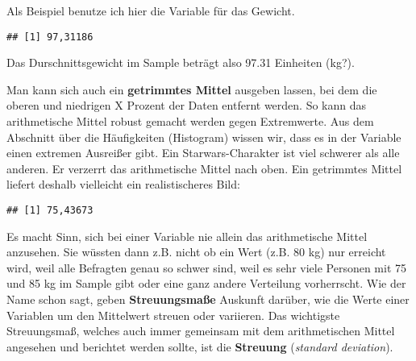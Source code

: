\documentclass[
]{book}
\newenvironment{Shaded}{\begin{snugshade}}{\end{snugshade}}
\newcommand{\AttributeTok}[1]{\textcolor[rgb]{0.77,0.63,0.00}{#1}}
\newcommand{\ConstantTok}[1]{\textcolor[rgb]{0.00,0.00,0.00}{#1}}
\newcommand{\FloatTok}[1]{\textcolor[rgb]{0.00,0.00,0.81}{#1}}
\newcommand{\FunctionTok}[1]{\textcolor[rgb]{0.00,0.00,0.00}{#1}}
\newcommand{\NormalTok}[1]{#1}
\newcommand{\SpecialCharTok}[1]{\textcolor[rgb]{0.00,0.00,0.00}{#1}}
\begin{document}
Als Beispiel benutze ich hier die Variable für das Gewicht.

\begin{Shaded}
\end{Shaded}

\begin{verbatim}
## [1] 97,31186
\end{verbatim}

Das Durschnittsgewicht im Sample beträgt also 97.31 Einheiten (kg?).

Man kann sich auch ein \textbf{getrimmtes Mittel} ausgeben lassen, bei dem die oberen und niedrigen X Prozent der Daten entfernt werden. So kann das arithmetische Mittel robust gemacht werden gegen Extremwerte. Aus dem Abschnitt über die Häufigkeiten (Histogram) wissen wir, dass es in der Variable einen extremen Ausreißer gibt. Ein Starwars-Charakter ist viel schwerer als alle anderen. Er verzerrt das arithmetische Mittel nach oben. Ein getrimmtes Mittel liefert deshalb vielleicht ein realistischeres Bild:

\begin{Shaded}
\end{Shaded}

\begin{verbatim}
## [1] 75,43673
\end{verbatim}

Es macht Sinn, sich bei einer Variable nie allein das arithmetische Mittel anzusehen. Sie wüssten dann z.B. nicht ob ein Wert (z.B. 80 kg) nur erreicht wird, weil alle Befragten genau so schwer sind, weil es sehr viele Personen mit 75 und 85 kg im Sample gibt oder eine ganz andere Verteilung vorherrscht. Wie der Name schon sagt, geben \textbf{Streuungsmaße} Auskunft darüber, wie die Werte einer Variablen um den Mittelwert streuen oder variieren. Das wichtigste Streuungsmaß, welches auch immer gemeinsam mit dem arithmetischen Mittel angesehen und berichtet werden sollte, ist die \textbf{Streuung} (\emph{standard deviation}).
\end{document}
